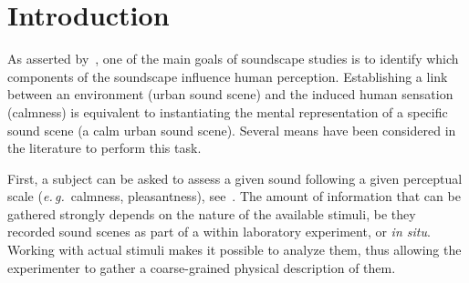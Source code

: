 \documentclass[12pt]{elsarticle}
\newcommand{\eg}{\emph{e.\,g.}}
\begin{document}
\setlength{\parindent}{5ex}

\section{Introduction}
\label{sec:intro}


As asserted by~\cite{aletta2016soundscape}, one of the main goals of soundscape studies is to identify which components of the soundscape influence human perception. Establishing a link between an environment (urban sound scene) and the induced human sensation (calmness) is equivalent to instantiating the mental representation of a specific sound scene (a calm urban sound scene). Several means have been considered in the literature to perform this task.


First, a subject can be asked to assess a given sound following a given perceptual scale (\eg~calmness, pleasantness), see~\cite{axelsson2005soundscape,davies2013perception,cain2013development}. The amount of information that can be gathered strongly depends on the nature of the available stimuli, be they recorded sound scenes as part of a within laboratory experiment, or \emph{in situ}. Working with actual stimuli makes it possible to analyze them, thus allowing the experimenter to gather a coarse-grained physical description of them.

\end{document}
